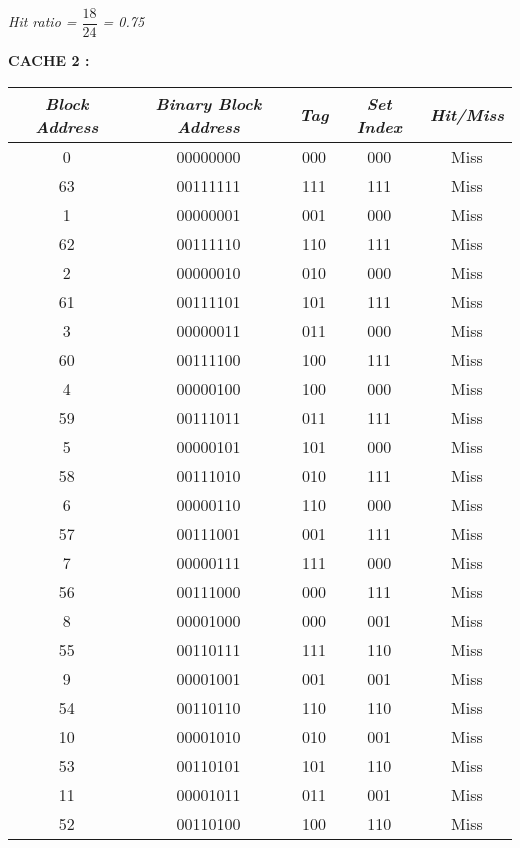 \documentclass[letterpaper]{article}
\begin{document}
\begin{large}
\begin{flushleft}
\begin{enumerate}
\begin{enumerate}
\begin{center}
\textit{Hit ratio = $\dfrac{18}{24}$ = 0.75}\\[0.2in]
\end{center}
\textbf{CACHE 2 :}\\
\begin{table}[h]
\centering
\begin{tabular}{|c|c|c|c|c|}
\hline
\textit{\textbf{Block Address}} & \textit{\textbf{Binary Block Address }}&\textit{\textbf{ Tag }}& \textit{\textbf{Set Index }}& \textit{\textbf{Hit/Miss}}\\
\hline
0 & 00000000 & 000 & 000 & Miss\\
\hline
63 & 00111111 & 111 & 111 & Miss\\
\hline
1 & 00000001 & 001 & 000 & Miss\\
\hline
62 & 00111110 & 110 & 111 & Miss\\
\hline
2 & 00000010 & 010 & 000 & Miss\\
\hline
61 & 00111101 & 101 & 111 & Miss\\
\hline
3 & 00000011 & 011 & 000 & Miss\\
\hline
60 & 00111100 & 100 & 111 & Miss\\
\hline
4 & 00000100 & 100 & 000 & Miss\\
\hline
59 & 00111011 & 011 & 111 & Miss\\
\hline 
5 & 00000101 & 101 & 000 & Miss\\
\hline
58 & 00111010 & 010 & 111 & Miss\\
\hline
6 & 00000110 & 110 & 000 & Miss\\
\hline
57 & 00111001 & 001 & 111 & Miss\\
\hline
7 & 00000111 & 111 & 000 & Miss\\
\hline
56 & 00111000 & 000 & 111 & Miss\\
\hline
8 & 00001000 & 000 & 001 & Miss\\
\hline
55 & 00110111 & 111 & 110 & Miss\\
\hline
9 & 00001001 & 001 & 001 & Miss\\
\hline
54 & 00110110 & 110 & 110 & Miss\\
\hline
10 & 00001010 & 010 & 001 & Miss\\
\hline
53 & 00110101 & 101 & 110 & Miss\\
\hline
11 & 00001011 & 011 & 001 & Miss\\
\hline
52 & 00110100 & 100 & 110 & Miss\\
\hline
\end{tabular}

\end{table}
\end{enumerate}
\end{enumerate}
\end{flushleft}
\end{large}
\end{document}
